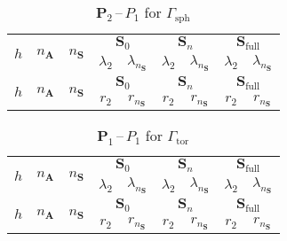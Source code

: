 \documentclass[12pt]{article}
\newcommand{\vect}[1]{\boldsymbol{\mathbf{#1}}}
\newcommand{\sphere}{{\Gamma_{\text{sph}}}}
\newcommand{\tor}{{\Gamma_{\text{tor}}}}
\begin{document}
\begin{table}[h!]
	\centering
	\caption{$\vect P_2$\,--\,$P_1$ for $\sphere$} 
	\label{tab:p2p1}
	\small
	\begin{tabular}[1.3]{|c|c|c|c|c|c|c|c|c|}
		\hline
		\multirow{2}{*}{$h$} & \multirow{2}{*}{$n_{\vect A}$} & \multirow{2}{*}{$n_{\vect S}$} & \multicolumn{2}{c|}{$\vect S_0$} & \multicolumn{2}{c|}{$\vect S_n$} & \multicolumn{2}{c|}{$\vect S_{\text{full}}$} \\ 
		\cline{4-9}
		& & & $\lambda_2$ & $\lambda_{n_{\vect S}}$ & $\lambda_2$ & $\lambda_{n_{\vect S}}$ & $\lambda_2$ & $\lambda_{n_{\vect S}}$ \\ 
		\hline
		
		\multirow{2}{*}{$h$} & \multirow{2}{*}{$n_{\vect A}$} & \multirow{2}{*}{$n_{\vect S}$} & \multicolumn{2}{c|}{$\vect S_0$} & \multicolumn{2}{c|}{$\vect S_n$} & \multicolumn{2}{c|}{$\vect S_{\text{full}}$} \\ 
		\cline{4-9}
		& & & $r_2$ & $r_{n_{\vect S}}$ & $r_2$ & $r_{n_{\vect S}}$ & $r_2$ & $r_{n_{\vect S}}$ \\ 
		\hline
		
	\end{tabular}
\end{table}

\begin{table}[h!]
	\centering
	\caption{$\vect P_1$\,--\,$P_1$ for $\tor$} 
	\label{tab:p1p1_tor}
	\small
	\begin{tabular}[1.3]{|c|c|c|c|c|c|c|c|c|}
		\hline
		\multirow{2}{*}{$h$} & \multirow{2}{*}{$n_{\vect A}$} & \multirow{2}{*}{$n_{\vect S}$} & \multicolumn{2}{c|}{$\vect S_0$} & \multicolumn{2}{c|}{$\vect S_n$} & \multicolumn{2}{c|}{$\vect S_{\text{full}}$} \\ 
		\cline{4-9}
		& & & $\lambda_2$ & $\lambda_{n_{\vect S}}$ & $\lambda_2$ & $\lambda_{n_{\vect S}}$ & $\lambda_2$ & $\lambda_{n_{\vect S}}$ \\ 
		\hline
		
		\multirow{2}{*}{$h$} & \multirow{2}{*}{$n_{\vect A}$} & \multirow{2}{*}{$n_{\vect S}$} & \multicolumn{2}{c|}{$\vect S_0$} & \multicolumn{2}{c|}{$\vect S_n$} & \multicolumn{2}{c|}{$\vect S_{\text{full}}$} \\ 
		\cline{4-9}
		& & & $r_2$ & $r_{n_{\vect S}}$ & $r_2$ & $r_{n_{\vect S}}$ & $r_2$ & $r_{n_{\vect S}}$ \\ 
		\hline
		
	\end{tabular}
\end{table}
\end{document}
